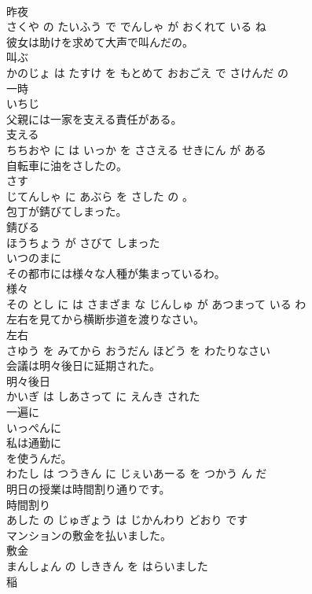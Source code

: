 \documentclass[8pt]{extreport}
\begin{document}
\begin{CJK}{UTF8}{min}
\\	昨夜 
\\	さくや の たいふう で でんしゃ が おくれて いる ね			
\\	彼女は助けを求めて大声で叫んだの。	
\\	叫ぶ 
\\	かのじょ は たすけ を もとめて おおごえ で さけんだ の			
\\	一時	
\\	いちじ		
\\	父親には一家を支える責任がある。	
\\	支える 
\\	ちちおや に は いっか を ささえる せきにん が ある			
\\	自転車に油をさしたの。	
\\	さす 
\\	じてんしゃ に あぶら を さした の 。			
\\	包丁が錆びてしまった。	
\\	錆びる 
\\	ほうちょう が さびて しまった			
\\	いつのまに	
\\	その都市には様々な人種が集まっているわ。	
\\	様々 
\\	その とし に は さまざま な じんしゅ が あつまって いる わ			
\\	左右を見てから横断歩道を渡りなさい。	
\\	左右 
\\	さゆう を みてから おうだん ほどう を わたりなさい			
\\	会議は明々後日に延期された。	
\\	明々後日 
\\	かいぎ は しあさって に えんき された			
\\	一遍に	
\\	いっぺんに		
\\	私は通勤に
\\	を使うんだ。	
\\	わたし は つうきん に じぇいあーる を つかう ん だ			
\\	明日の授業は時間割り通りです。	
\\	時間割り 
\\	あした の じゅぎょう は じかんわり どおり です			
\\	マンションの敷金を払いました。	
\\	敷金 
\\	まんしょん の しききん を はらいました			
\\	稲	

\end{CJK}
\end{document}
